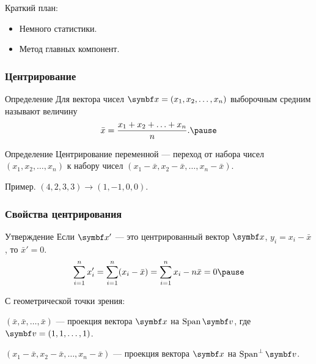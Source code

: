 
\begin{frame} %


\end{frame}



\begin{frame}{Краткий план:}
  \begin{itemize}[<+->]
    \item Немного статистики.
    \item Метод главных компонент.
  \end{itemize}

\end{frame}

\begin{frame}
  \frametitle{Центрирование}


  \begin{block}{Определение}
    Для вектора чисел $\bx = (x_1, x_2, \ldots, x_n)$ \alert{выборочным средним} называют величину
    \[
    \bar x = \frac{x_1 + x_2 + \ldots + x_n}{n}. \pause
    \]
  \end{block}

  \begin{block}{Определение}
    \alert{Центрирование переменной} — переход от набора чисел
    $(x_1, x_2, \ldots, x_n)$ к набору чисел $(x_1 - \bar x, x_2 - \bar x, \ldots, x_n - \bar x)$. \pause
  \end{block}

  Пример. $(4, 2, 3, 3) \to (1, -1, 0, 0)$.

\end{frame}


\begin{frame}
  \frametitle{Свойства центрирования}

  \begin{block}{Утверждение}
Если $\bx'$ — это центрированный вектор $\bx$, $y_i = x_i - \bar x$, то 
$\bar x' = 0$. \pause
\[
\sum_{i=1}^n x'_i = \sum_{i=1}^n (x_i - \bar x) = \sum_{i=1}^n x_i - n\bar x =0  \pause
\]
  \end{block}

  С геометрической точки зрения:
  
  $(\bar x, \bar x, \ldots, \bar x)$ — проекция вектора $\bx$ на $\Span \bv$, где
  $\bv = (1, 1, \ldots, 1)$. \pause


$(x_1 - \bar x, x_2 - \bar x, \ldots, x_n - \bar x)$ — проекция вектора $\bx$ на $\Span^{\perp} \bv$.


\end{frame}



